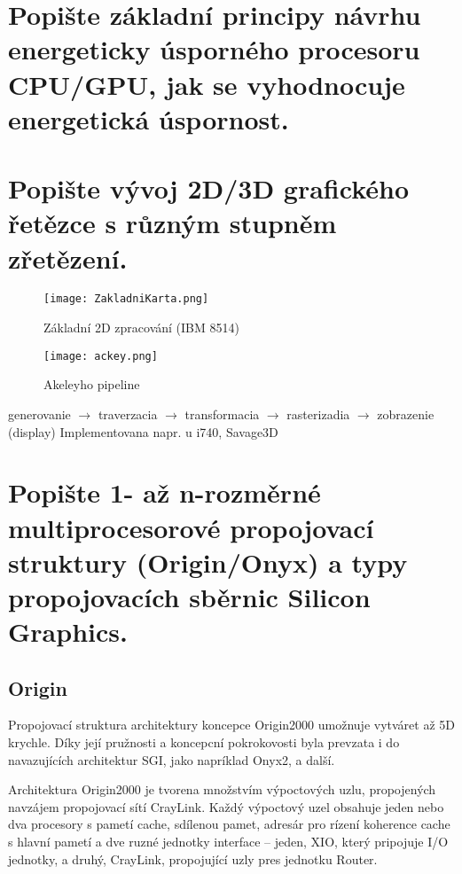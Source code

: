 




\newcommand\courseShortcut{GMU}
\newcommand\courseName{Grafické a multimediální procesory}
\newcommand\projectName{Příprava na zkoušku}




	


\section{Popište základní principy návrhu energeticky úsporného procesoru CPU/GPU, jak se vyhodnocuje energetická úspornost.}
	\todo


\section{Popište vývoj 2D/3D grafického řetězce s různým stupněm zřetězení.}
	\begin{figure}[h]
		\centering
		\texttt{[image: ZakladniKarta.png]}
		\caption{Základní 2D zpracování (IBM 8514)}
		\label{fig:ZakladniKarta}
	\end{figure}

	\begin{figure}[h!]
		\centering
		\texttt{[image: ackey.png]}
		\caption{Akeleyho pipeline}
		\label{fig:ackey}
	\end{figure}
	generovanie $\rightarrow$ traverzacia $\rightarrow$ transformacia $\rightarrow$ rasterizadia $\rightarrow$ zobrazenie (display) Implementovana napr. u i740, Savage3D


\section{Popište 1- až n-rozměrné multiprocesorové propojovací struktury (Origin/Onyx) a typy propojovacích sběrnic Silicon Graphics.}
	\subsection*{Origin}
		Propojovací struktura architektury koncepce Origin2000 umožnuje vytváret až 5D krychle. Díky její pružnosti a koncepcní pokrokovosti byla prevzata i do navazujících architektur SGI, jako napríklad Onyx2, a další.
		
		Architektura Origin2000 je tvorena množstvím výpoctových uzlu, propojených navzájem propojovací sítí CrayLink. Každý výpoctový uzel obsahuje jeden nebo dva procesory s pametí cache, sdílenou pamet, adresár pro rízení koherence cache s hlavní pametí a dve ruzné jednotky interface – jeden, XIO, který pripojuje I/O jednotky, a druhý, CrayLink, propojující uzly pres jednotku Router.

